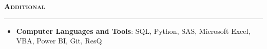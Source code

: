 \documentclass[11pt,letterpaper]{article}
\newcommand{\sectline}{\vspace{5pt}\hrule height 1.5pt\vspace{5pt}}
\newcommand{\sectspace}{\vspace{9pt}}
\newcommand{\smallspace}{\vspace{6pt}}
\newcommand{\heading}[1]{{\fontsize{12pt}{13pt} {\textbf{\textsc{#1}}}}}
\begin{document}


\heading{Additional}\sectline
\begin{itemize}
	\item \textbf{Computer Languages and Tools}: SQL, Python, SAS, Microsoft Excel, VBA, Power BI, Git, ResQ
\end{itemize}
\end{document}
